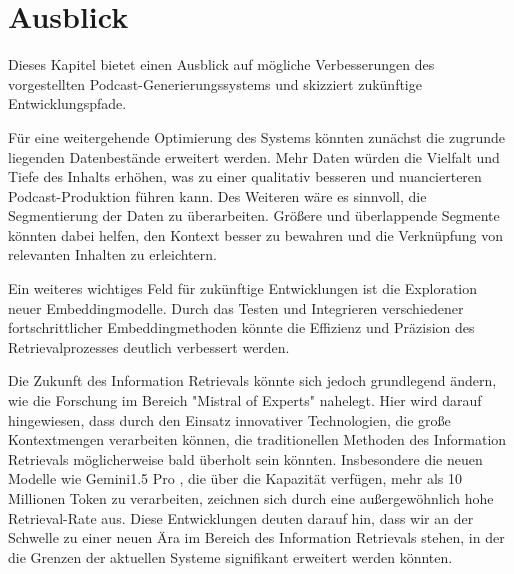 \chapter{Ausblick}\label{ch:outlook}

Dieses Kapitel bietet einen Ausblick auf mögliche Verbesserungen des vorgestellten Podcast-Generierungssystems und skizziert zukünftige Entwicklungspfade.

Für eine weitergehende Optimierung des Systems könnten zunächst die zugrunde liegenden Datenbestände erweitert werden. Mehr Daten würden die Vielfalt und Tiefe des Inhalts erhöhen, was zu einer qualitativ besseren und nuancierteren Podcast-Produktion führen kann. Des Weiteren wäre es sinnvoll, die Segmentierung der Daten zu überarbeiten. Größere und überlappende Segmente könnten dabei helfen, den Kontext besser zu bewahren und die Verknüpfung von relevanten Inhalten zu erleichtern.

Ein weiteres wichtiges Feld für zukünftige Entwicklungen ist die Exploration neuer Embeddingmodelle. Durch das Testen und Integrieren verschiedener fortschrittlicher Embeddingmethoden könnte die Effizienz und Präzision des Retrievalprozesses deutlich verbessert werden.

Die Zukunft des Information Retrievals könnte sich jedoch grundlegend ändern, wie die Forschung im Bereich "Mistral of Experts" \cite{jiang2024} nahelegt. Hier wird darauf hingewiesen, dass durch den Einsatz innovativer Technologien, die große Kontextmengen verarbeiten können, die traditionellen Methoden des Information Retrievals möglicherweise bald überholt sein könnten. Insbesondere die neuen Modelle wie Gemini1.5 Pro \cite{2024d}, die über die Kapazität verfügen, mehr als 10 Millionen Token zu verarbeiten, zeichnen sich durch eine außergewöhnlich hohe Retrieval-Rate aus. Diese Entwicklungen deuten darauf hin, dass wir an der Schwelle zu einer neuen Ära im Bereich des Information Retrievals stehen, in der die Grenzen der aktuellen Systeme signifikant erweitert werden könnten.





